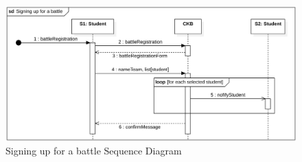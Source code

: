 \clearpage
\begin{figure}[h]
    \centering
    \includegraphics[scale=0.6]{images/SD/SigningUpBattleSD.png} 
    \caption{Signing up for a battle Sequence Diagram}
    \label{fig_SigningUpBattleSD}
\end{figure}

